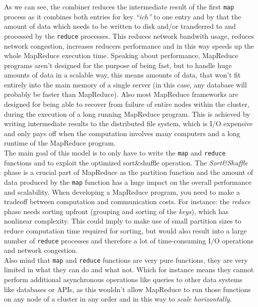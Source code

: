 {As we can see, the combiner reduces the intermediate result of the first \lstinline{map} process as it combines both entries for key \textit{``ich''} to one entry and by that the amount of data which needs to be written to disk and/or transferred to and processed by the \lstinline{reduce} processes. This reduces network bandwith usage, reduces network congestion, increases reducers performance and in this way speeds up the whole MapReduce execution time.
\newpage
Speaking about performance, MapReduce programs aren't designed for the purpose of being fast, but to handle huge amounts of data in a scalable way, this means amounts of data, that won't fit entirely into the main memory of a single server (in this case, any database will probably be faster than MapReduce). Also most MapReduce frameworks are designed for being able to recover from failure of entire nodes within the cluster, during the execution of a long running MapReduce program. This is achieved by writing intermediate results to the distributed file system, which is I/O expensive and only pays off when the computation involves many computers and a long runtime of the MapReduce program. \\
The main goal of this model is to only have to write the \lstinline{map} and \lstinline{reduce} functions and to exploit the optimized sort\&shuffle operation. The \textit{Sort\&Shuffle} phase is a crucial part of MapReduce as the partition function and the amount of data produced by the \lstinline{map} function has a huge impact on the overall performance and scalability. When developing a MapReduce program, you need to make a tradeoff between computation and communication costs. For instance: the \textit{reduce} phase needs sorting upfront (grouping and sorting of the \textit{keys}), which has nonlinear complexity. This could imply to make use of small partition sizes to reduce computation time required for sorting, but would also result into a large number of \lstinline{reduce} processes and therefore a lot of time-consuming I/O operations and network congestion.\\
Also mind that \lstinline{map} and \lstinline{reduce} functions are very pure functions, they are very limited in what they can do and what not. Which for instance means they cannot perform additional asynchronous operations like queries to other data systems like databases or APIs, as this wouldn't allow MapReduce to run those functions on any node of a cluster in any order and in this way to \textit{scale horizontally}.\\

}
